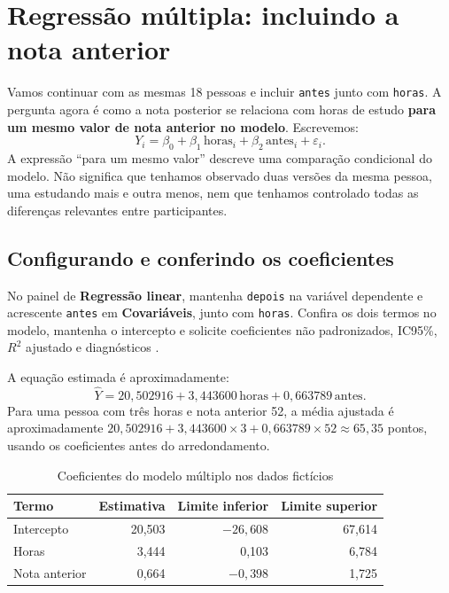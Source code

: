 \section{Regressão múltipla: incluindo a nota anterior}
\label{sec:regressao-multipla}

Vamos continuar com as mesmas 18 pessoas e incluir \texttt{antes} junto com \texttt{horas}. A pergunta agora é como a nota posterior se relaciona com horas de estudo \textbf{para um mesmo valor de nota anterior no modelo}. Escrevemos:
\[
Y_i=\beta_0+\beta_1\,\text{horas}_i+
\beta_2\,\text{antes}_i+\varepsilon_i.
\]
A expressão ``para um mesmo valor'' descreve uma comparação condicional do modelo. Não significa que tenhamos observado duas versões da mesma pessoa, uma estudando mais e outra menos, nem que tenhamos controlado todas as diferenças relevantes entre participantes.

\subsection{Configurando e conferindo os coeficientes}

No painel de \textbf{Regressão linear}, mantenha \texttt{depois} na variável dependente e acrescente \texttt{antes} em \textbf{Covariáveis}, junto com \texttt{horas}. Confira os dois termos no modelo, mantenha o intercepto e solicite coeficientes não padronizados, IC95\%, $R^2$ ajustado e diagnósticos \parencite{JamoviRegressao}.

A equação estimada é aproximadamente:
\[
\widehat{Y}=20{,}502916+3{,}443600\,\text{horas}
+0{,}663789\,\text{antes}.
\]
Para uma pessoa com três horas e nota anterior 52, a média ajustada é aproximadamente $20{,}502916+3{,}443600\times3+0{,}663789\times52\approx65{,}35$ pontos, usando os coeficientes antes do arredondamento.

\begin{table}[H]
\centering
\caption{Coeficientes do modelo múltiplo nos dados fictícios}
\begin{tabular}{lrrr}
\hline
Termo & Estimativa & Limite inferior & Limite superior \\
\hline
Intercepto & 20,503 & $-26{,}608$ & 67,614 \\
Horas & 3,444 & 0,103 & 6,784 \\
Nota anterior & 0,664 & $-0{,}398$ & 1,725 \\
\hline
\end{tabular}
\label{tab:regressao-multipla}
\end{table}

